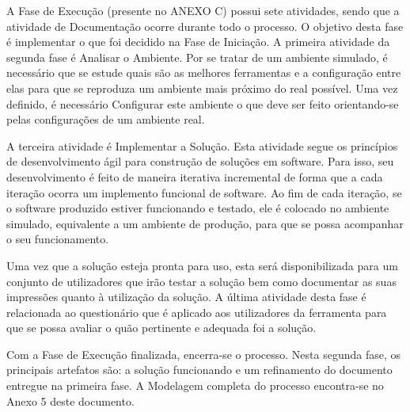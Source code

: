 A Fase de Execução (presente no ANEXO C) possui sete atividades, sendo que a atividade de Documentação ocorre durante todo o processo. O objetivo desta fase é implementar o que foi decidido na Fase de Iniciação. A primeira atividade da segunda fase é Analisar o Ambiente. Por se tratar de um ambiente simulado, é necessário que se estude quais são as melhores ferramentas e a configuração entre elas para que se reproduza um ambiente mais próximo do real possível. Uma vez definido, é necessário Configurar este ambiente  o que deve ser feito orientando-se pelas configurações de um ambiente real.

A terceira atividade é Implementar a Solução. Esta atividade segue os princípios de desenvolvimento ágil para construção de soluções em software. Para isso, seu desenvolvimento é feito de maneira iterativa incremental de forma que a cada iteração ocorra um implemento funcional de software. Ao fim de cada iteração, se o software produzido estiver funcionando e testado, ele é colocado no ambiente simulado, equivalente a um ambiente de produção, para que se possa acompanhar o seu funcionamento.

Uma vez que a solução esteja pronta para uso,  esta será disponibilizada para um conjunto de utilizadores que irão testar a solução bem como documentar as suas impressões quanto à utilização da solução. A última atividade desta fase é relacionada ao questionário que é aplicado aos utilizadores da ferramenta para que se possa avaliar o quão pertinente e adequada foi a solução. 

Com a Fase de Execução finalizada, encerra-se o processo. Nesta segunda fase, os principais artefatos são: a solução funcionando e um refinamento do documento entregue na primeira fase. A Modelagem completa do processo encontra-se no Anexo 5 deste documento.


